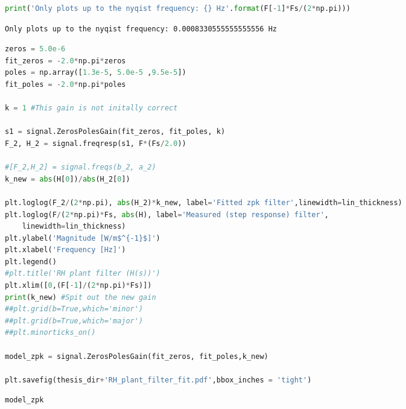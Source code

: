 \begin{spacing}{1.2} \begin{lstlisting}[frame=single,language=Python]
print('Only plots up to the nyqist frequency: {} Hz'.format(F[-1]*Fs/(2*np.pi)))
\end{lstlisting} \end{spacing}

\begin{spacing}{1.2} \begin{lstlisting}
Only plots up to the nyqist frequency: 0.0008330555555555556 Hz
\end{lstlisting} \end{spacing}

\begin{spacing}{1.2} \begin{lstlisting}[frame=single,language=Python]
zeros = 5.0e-6
fit_zeros = -2.0*np.pi*zeros
poles = np.array([1.3e-5, 5.0e-5 ,9.5e-5])
fit_poles = -2.0*np.pi*poles

k = 1 #This gain is not initally correct

s1 = signal.ZerosPolesGain(fit_zeros, fit_poles, k)
F_2, H_2 = signal.freqresp(s1, F*(Fs/2.0))

#[F_2,H_2] = signal.freqs(b_2, a_2)
k_new = abs(H[0])/abs(H_2[0])

plt.loglog(F_2/(2*np.pi), abs(H_2)*k_new, label='Fitted zpk filter',linewidth=lin_thickness)
plt.loglog(F/(2*np.pi)*Fs, abs(H), label='Measured (step response) filter',
    linewidth=lin_thickness)
plt.ylabel('Magnitude [W/m$^{-1}$]')
plt.xlabel('Frequency [Hz]')
plt.legend()
#plt.title('RH plant filter (H(s))')
plt.xlim([0,(F[-1]/(2*np.pi)*Fs)])
print(k_new) #Spit out the new gain
##plt.grid(b=True,which='minor')
##plt.grid(b=True,which='major')
##plt.minorticks_on()

model_zpk = signal.ZerosPolesGain(fit_zeros, fit_poles,k_new)

plt.savefig(thesis_dir+'RH_plant_filter_fit.pdf',bbox_inches = 'tight')
\end{lstlisting} \end{spacing}


\begin{spacing}{1.2} \begin{lstlisting}[frame=single,language=Python]
model_zpk
\end{lstlisting} \end{spacing}

